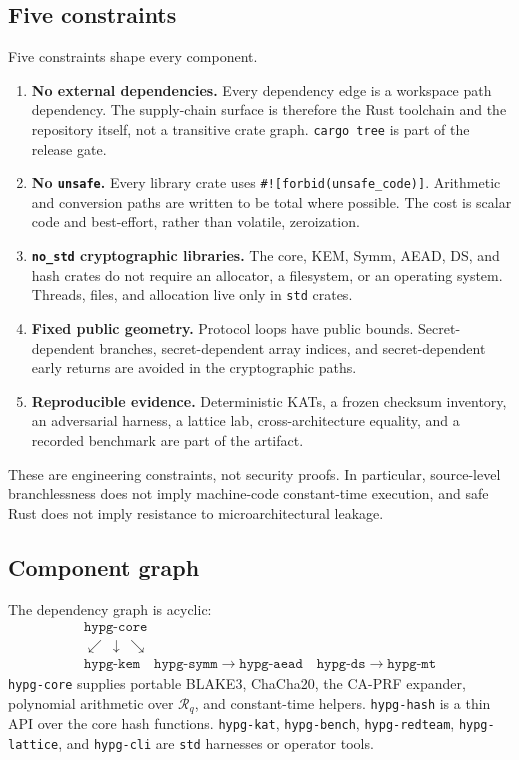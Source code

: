 \documentclass[runningheads]{llncs}
\newcommand{\Ring}{\mathcal{R}_q}
\begin{document}
\subsection{Five constraints}

Five constraints shape every component.

\begin{enumerate}[leftmargin=*]
\item \textbf{No external dependencies.}  Every dependency edge is a
  workspace path dependency.  The supply-chain surface is therefore the
  Rust toolchain and the repository itself, not a transitive crate
  graph.  \texttt{cargo tree} is part of the release gate.
\item \textbf{No \texttt{unsafe}.}  Every library crate uses
  \texttt{\#![forbid(unsafe\_code)]}.  Arithmetic and conversion paths
  are written to be total where possible.  The cost is scalar code and
  best-effort, rather than volatile, zeroization.
\item \textbf{\texttt{no\_std} cryptographic libraries.}  The core,
  KEM, Symm, AEAD, DS, and hash crates do not require an allocator, a
  filesystem, or an operating system.  Threads, files, and allocation
  live only in \texttt{std} crates.
\item \textbf{Fixed public geometry.}  Protocol loops have public
  bounds.  Secret-dependent branches, secret-dependent array indices,
  and secret-dependent early returns are avoided in the cryptographic
  paths.
\item \textbf{Reproducible evidence.}  Deterministic KATs, a frozen
  checksum inventory, an adversarial harness, a lattice lab,
  cross-architecture equality, and a recorded benchmark are part of the
  artifact.
\end{enumerate}

These are engineering constraints, not security proofs.  In particular,
source-level branchlessness does not imply machine-code constant-time
execution, and safe Rust does not imply resistance to microarchitectural
leakage.

\subsection{Component graph}

The dependency graph is acyclic:
\[
\begin{array}{c}
\texttt{hypg-core}\\[-1mm]
\swarrow\ \downarrow\ \searrow\\[-1mm]
\texttt{hypg-kem}\quad
\texttt{hypg-symm}\to\texttt{hypg-aead}\quad
\texttt{hypg-ds}\to\texttt{hypg-mt}
\end{array}
\]
\texttt{hypg-core} supplies portable BLAKE3, ChaCha20, the CA-PRF
expander, polynomial arithmetic over $\Ring$, and constant-time
helpers.  \texttt{hypg-hash} is a thin API over the core hash
functions.  \texttt{hypg-kat}, \texttt{hypg-bench},
\texttt{hypg-redteam}, \texttt{hypg-lattice}, and \texttt{hypg-cli} are
\texttt{std} harnesses or operator tools.
\end{document}
